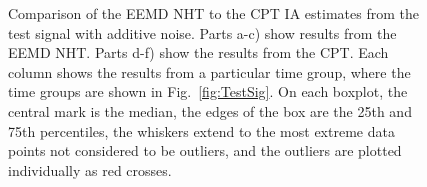 \documentclass[11pt,draftcls,onecolumn]{IEEEtran}
\begin{document}
\begin{figure}[ht]
		\caption{Comparison of the EEMD NHT to the CPT IA estimates from the test signal with additive noise. Parts a-c) show results from the EEMD NHT. Parts d-f) show the results from the CPT. Each column shows the results from a particular time group, where the time groups are shown in Fig.~\ref{fig:TestSig}. On each boxplot, the central mark is the median, the edges of the box are the 25th and 75th percentiles, the whiskers extend to the most extreme data points not considered to be outliers, and the outliers are plotted individually as red crosses.}
		\label{fig:RMSEComparisonSig1_IA}
\end{figure}
\end{document}
